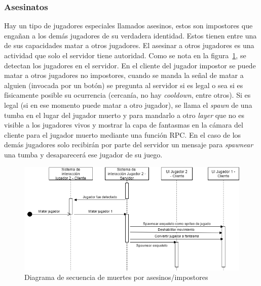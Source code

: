 \subsubsection{Asesinatos}
Hay un tipo de jugadores especiales llamados asesinos, estos son impostores que engañan a los demás jugadores de su verdadera identidad. Estos tienen entre una de sus capacidades matar a otros jugadores. El asesinar a otros jugadores es una actividad que solo el servidor tiene autoridad.
Como se nota en la figura~\ref{fig:diagrama_sec_muertes_por_impost}, se detectan los jugadores en el servidor. En el cliente del jugador impostor se puede matar a otros jugadores no impostores, cuando se manda la señal de matar a alguien (invocada por un botón) se pregunta al servidor si es legal o sea si es físicamente posible su ocurrencia (cercanía, no hay \textit{cooldown}, entre otros). Si es legal (si en ese momento puede matar a otro jugador), se llama el \textit{spawn} de una tumba en el lugar del jugador muerto y para mandarlo a otro \textit{layer} que no es visible a los jugadores vivos y mostrar la capa de fantasmas en la cámara del cliente para el jugador muerto mediante una función RPC. En el caso de los demás jugadores solo recibirán por parte del servidor un mensaje para \textit{spawnear} una tumba y desaparecerá ese jugador de su juego.
\begin{figure}[h!]
    \centering
    \includegraphics[width=1\linewidth]{images/diagrama_sec_matar.png}
    \caption{Diagrama de secuencia de muertes por asesinos/impostores}
    \label{fig:diagrama_sec_muertes_por_impost}
\end{figure}

